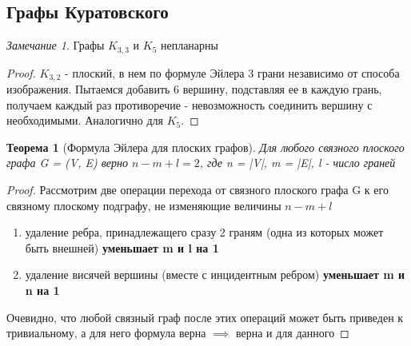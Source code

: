 \documentclass[a4paper]{article}
\newtheorem{theorem}{Теорема}[section]
\theoremstyle{definition}
\theoremstyle{remark}
\newtheorem*{remark}{Замечание}
\begin{document}
\begin{multicols*}{2}
    \subsection*{Графы Куратовского}
    \begin{remark}
        Графы $K_{3,3}$ и $K_5$ непланарны
    \end{remark}
    \begin{proof}
        $K_{3, 2}$ - плоский, в нем по формуле Эйлера 3 грани независимо от способа изображения.
        Пытаемся добавить 6 вершину, подставляя ее в каждую грань, получаем каждый раз противоречие - 
        невозможность соединить вершину с необходимыми.
        Аналогично для $K_5$.
    \end{proof}
    \begin{theorem}[Формула Эйлера для плоских графов]
        Для любого связного плоского графа G = (V, E) верно $n - m + l = 2$, где n = |V|, m = |E|,
        l - число граней 
    \end{theorem}
    \begin{proof}
        Рассмотрим две операции перехода от связного плоского графа G к его связному 
        плоскому подграфу, не изменяющие величины $n - m + l$
        \begin{enumerate}
            \item удаление ребра, принадлежащего сразу 2 граням (одна из которых может быть внешней) \textbf{уменьшает m и l на 1}
            \item удаление висячей вершины (вместе с инцидентным ребром) \textbf{уменьшает m и n на 1}
        \end{enumerate}
        Очевидно, что любой связный граф после этих операций может быть приведен к тривиальному, а для него формула верна $\implies$
        верна и для данного 
    \end{proof}

\end{multicols*}
\end{document}
